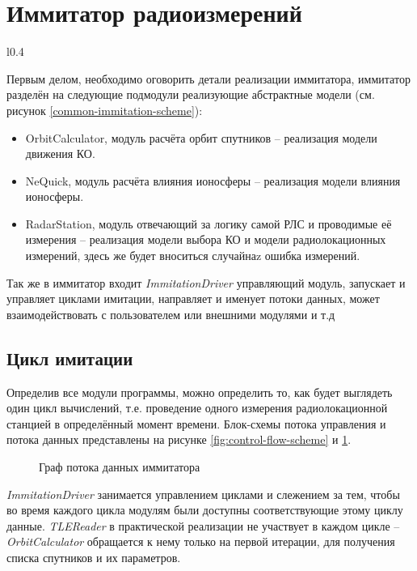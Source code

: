 \section{Иммитатор радиоизмерений}

\begin{wrapfigure}[25]{l}{0.4\textwidth}
	\begin{center}
		
	\end{center}
	\caption{Граф потока управления иммитатора} \label{fig:control-flow-scheme}
\end{wrapfigure}
Первым делом, необходимо оговорить детали реализации иммитатора, иммитатор разделён на следующие подмодули
реализующие абстрактные модели (см. рисунок \ref{common-immitation-scheme}):
\begin{itemize}
	\item OrbitCalculator, модуль расчёта орбит спутников -- реализация модели движения КО.
	\item NeQuick, модуль расчёта влияния ионосферы -- реализация модели влияния ионосферы.
	\item RadarStation, модуль отвечающий за логику самой РЛС и проводимые её измерения -- реализация модели выбора
			КО и модели радиолокационных измерений, здесь же будет вноситься случайнаz ошибка измерений.
\end{itemize}

Так же в иммитатор входит \textit{ImmitationDriver} управляющий модуль, запускает и управляет циклами имитации,
направляет и именует потоки данных, может взаимодействовать с пользователем или внешними модулями и т.д

\subsection{Цикл имитации}

Определив все модули программы, можно определить то, как будет выглядеть один цикл вычислений, т.е. проведение
одного измерения радиолокационной станцией в определённый момент времени. Блок-схемы потока управления и потока
данных представлены на рисунке \ref{fig:control-flow-scheme} и \ref{fig:data-flow-scheme}.
\begin{figure}[H]
	\centering
	
	\caption{Граф потока данных иммитатора} \label{fig:data-flow-scheme}
\end{figure}

\textit{ImmitationDriver} занимается управлением циклами и слежением за тем, чтобы во время каждого цикла модулям
были доступны соответствующие этому циклу данные. \textit{TLEReader} в практической реализации не участвует в каждом 
цикле -- \textit{OrbitCalculator} обращается к нему только на первой итерации, для получения списка спутников 
и их параметров.


